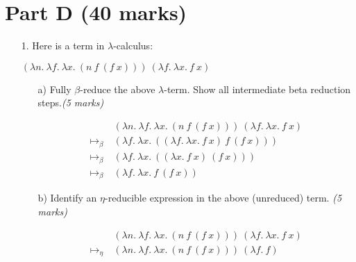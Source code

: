 \documentclass[a4paper,answers]{exam}
\begin{document}
\newpage
\section*{Part D (40 marks)}
\begin{itemize}
    \item [1.] Here is a term in $\lambda$-calculus:
    \begin{center}
        $(\lambda n.\ \lambda f.\ \lambda x.\ (n\ f\ (f\ x)))\ (\lambda f.\ \lambda x.\ f\ x)$
    \end{center}
    \begin{itemize}
        \item[a)] Fully $\beta$-reduce the above $\lambda$-term. Show all intermediate beta reduction steps.\textit{(5 marks)}
        \begin{solution}
            \begin{align*}
                &(\lambda n.\ \lambda f.\ \lambda x.\ (n\ f\ (f\ x)))\ (\lambda f.\ \lambda x.\ f\ x)\\
                \mapsto_\beta\ & (\lambda f.\ \lambda x.\ ((\lambda f.\ \lambda x.\ f\ x)\ f\ (f\ x)))\\
                \mapsto_\beta\ & (\lambda f.\ \lambda x.\ ((\lambda x.\ f\ x)\ (f\ x)))\\
                \mapsto_\beta\ & (\lambda f.\ \lambda x.\ f\ (f\ x))
            \end{align*}
        \end{solution}
        
        \item[b)] Identify an $\eta$-reducible expression in the above (unreduced) term. \textit{(5 marks)}
        \begin{solution}
            \begin{align*}
                &(\lambda n.\ \lambda f.\ \lambda x.\ (n\ f\ (f\ x)))\ (\lambda f.\ \lambda x.\ f\ x)\\
                \mapsto_\eta\ & (\lambda n.\ \lambda f.\ \lambda x.\ (n\ f\ (f\ x)))\ (\lambda f.\ f)
            \end{align*}
        \end{solution}
    \end{itemize}


\end{itemize}
\end{document}
